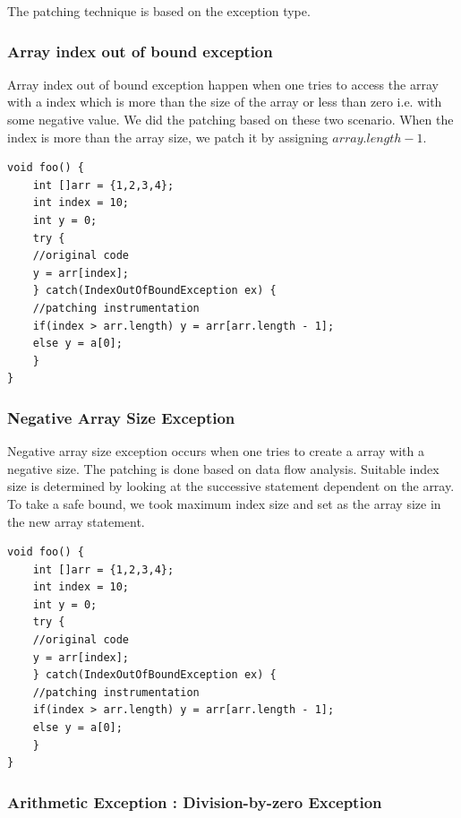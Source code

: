The patching technique is based on the exception type. 

\subsubsection{Array index out of bound exception}

Array index out of bound exception happen when one tries to access the array
with a index which is more than the size of the array or 
less than zero i.e. with some negative value. We did the patching based on these
two scenario. When the index is more than the array size, 
we patch it by assigning $array.length - 1$.

\lstset{language=Java, caption=array index out of bound patching,
label=patchingexample2}

\begin{lstlisting}[countblanklines=false]
void foo() {
    int []arr = {1,2,3,4};
    int index = 10;
    int y = 0;
    try {
	//original code
	y = arr[index];
    } catch(IndexOutOfBoundException ex) {
	//patching instrumentation
	if(index > arr.length) y = arr[arr.length - 1];
	else y = a[0];
    }
}
\end{lstlisting}

\subsubsection{Negative Array Size Exception}

Negative array size exception occurs when one tries to create a array with a
negative size. 
The patching is done based on data flow analysis. Suitable index size is
determined by looking at the successive statement dependent on the array. 
To take a safe bound, we took maximum index size and set as the array size in
the new array statement.


\lstset{language=Java, caption=arr index out of bound patching,
label=patchingexample2}

\begin{lstlisting}[countblanklines=false]
void foo() {
    int []arr = {1,2,3,4};
    int index = 10;
    int y = 0;
    try {
	//original code
	y = arr[index];
    } catch(IndexOutOfBoundException ex) {
	//patching instrumentation
	if(index > arr.length) y = arr[arr.length - 1];
	else y = a[0];
    }
}
\end{lstlisting}

\subsubsection{Arithmetic Exception : Division-by-zero Exception}

